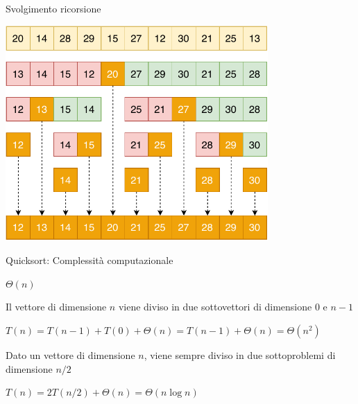 \begin{frame}{Svolgimento ricorsione}

\vspace{-12pt}
\begin{center}
\includegraphics[width=0.75\textwidth]{quicksort-esecuzione}
\end{center}

\end{frame}

\begin{frame}{Quicksort: Complessità computazionale}

\vspace{-9pt}
\pause
\BI
\item $\Theta(n)$
\EI

\pause
\BI
\item Il vettore di dimensione $n$ viene diviso in due sottovettori di 
dimensione $0$ e $n-1$
\item $T(n) = T(n-1)+T(0)+\Theta(n) = T(n-1) + \Theta(n) = \Theta(n^2)$
\EI

\pause
\BI
\item Dato un vettore di dimensione $n$, viene sempre diviso in due 
sottoproblemi di dimensione $n/2$
\item $T(n) = 2T(n/2)+\Theta(n) = \Theta(n \log n)$
\EI

\end{frame}

